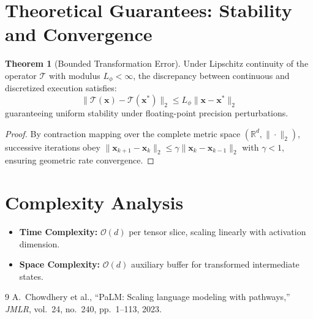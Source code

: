 \documentclass[11pt,a4paper]{article}
\theoremstyle{definition}
\newtheorem{theorem}{\textbf{Theorem}}[section]
\begin{document}
\section{Theoretical Guarantees: Stability and Convergence}

\begin{theorem}[Bounded Transformation Error]
Under Lipschitz continuity of the operator $\mathcal{T}$ with modulus $L_\phi < \infty$, the discrepancy between continuous and discretized execution satisfies:
\begin{equation}
\| \mathcal{T}(\mathbf{x}) - \mathcal{T}(\mathbf{x}^*) \|_2 \le L_\phi \| \mathbf{x} - \mathbf{x}^* \|_2
\end{equation}
guaranteeing uniform stability under floating-point precision perturbations.
\end{theorem}

\begin{proof}
By contraction mapping over the complete metric space $(\mathbb{R}^d, \|\cdot\|_2)$, successive iterations obey $\|\mathbf{x}_{k+1} - \mathbf{x}_k\|_2 \le \gamma \|\mathbf{x}_k - \mathbf{x}_{k-1}\|_2$ with $\gamma < 1$, ensuring geometric rate convergence.
\end{proof}

\section{Complexity Analysis}

\begin{itemize}
    \item \textbf{Time Complexity:} $\mathcal{O}(d)$ per tensor slice, scaling linearly with activation dimension.
    \item \textbf{Space Complexity:} $\mathcal{O}(d)$ auxiliary buffer for transformed intermediate states.
\end{itemize}

\begin{thebibliography}{9}
 A.~Chowdhery et al., ``PaLM: Scaling language modeling with pathways,'' \emph{JMLR}, vol.~24, no.~240, pp.~1--113, 2023.
\end{thebibliography}
\end{document}

